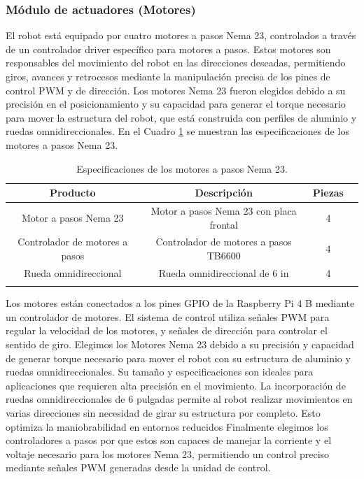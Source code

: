     \subsubsection{M\'odulo de actuadores (Motores)} %
    \label{ssub:modact}
    El robot est\'a equipado por cuatro motores a pasos Nema 23, controlados a trav\'es de
        un controlador driver espec\'ifico para motores a pasos. Estos motores son
        responsables del movimiento del robot en las direcciones deseadas, permitiendo giros,
        avances y retrocesos mediante la manipulaci\'on precisa de los pines de control PWM y
        de direcci\'on.
    \vskip 0.5cm
    Los motores Nema 23 fueron elegidos debido a su precisi\'on en el posicionamiento y
        su capacidad para generar el torque necesario para mover la estructura del robot, que
        est\'a construida con perfiles de aluminio y ruedas omnidireccionales. En el Cuadro
        \ref{tab:motor} se muestran las especificaciones de los motores a pasos Nema 23.
    \vskip 0.5cm
    \begin{longtable}{|c|c|c|c|}
        \hline
        \rowcolor{gray}
        \textbf{Producto} & \textbf{Descripci\'on} & \textbf{Piezas} \\
        \hline
        Motor a pasos Nema 23 & Motor a pasos Nema 23 con placa frontal & 4  \\
        Controlador de motores a pasos & Controlador de motores a pasos TB6600 & 4  \\
        Rueda omnidireccional & Rueda omnidireccional de 6 in & 4  \\
        \hline
        \caption{Especificaciones de los motores a pasos Nema 23.}
        \label{tab:motor}
    \end{longtable}
    \vskip 0.5cm
    Los motores est\'an conectados a los pines GPIO de la Raspberry Pi 4 B mediante un
        controlador de motores. El sistema de control utiliza se\~nales PWM para regular la
        velocidad de los motores, y se\~nales de direcci\'on para controlar el sentido de giro.
    \vskip 0.5cm
    Elegimos los Motores Nema 23 debido a su precisi\'on y capacidad de generar torque
        necesario para mover el robot con su estructura de aluminio y ruedas
        omnidireccionales. Su tama\~no y especificaciones son ideales para aplicaciones que
        requieren alta precisi\'on en el movimiento.
    \vskip 0.5cm
    La incorporaci\'on de ruedas omnidireccionales de 6 pulgadas permite al robot realizar
        movimientos en varias direcciones sin necesidad de girar su estructura por completo.
        Esto optimiza la maniobrabilidad en entornos reducidos
    \vskip 0.5cm
    Finalmente elegimos los controladores a pasos por que estos son capaces de manejar
        la corriente y el voltaje necesario para los motores Nema 23, permitiendo un control
        preciso mediante se\~nales PWM generadas desde la unidad de control.
    \vskip 0.5cm
